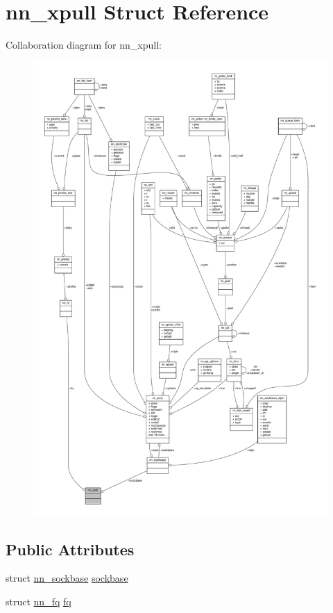 \hypertarget{structnn__xpull}{}\section{nn\+\_\+xpull Struct Reference}
\label{structnn__xpull}


Collaboration diagram for nn\+\_\+xpull\+:\nopagebreak
\begin{figure}[H]
\begin{center}
\leavevmode
\includegraphics[width=350pt]{structnn__xpull__coll__graph}
\end{center}
\end{figure}
\subsection*{Public Attributes}
\begin{DoxyCompactItemize}
\item 
struct \hyperlink{structnn__sockbase}{nn\+\_\+sockbase} \hyperlink{structnn__xpull_a99136496008d6c7a9399c96f00c85433}{sockbase}
\item 
struct \hyperlink{structnn__fq}{nn\+\_\+fq} \hyperlink{structnn__xpull_aaf4412eaae57eef0a4773453fcfe65d3}{fq}
\end{DoxyCompactItemize}


